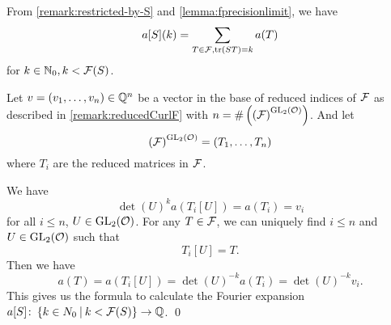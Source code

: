 \begin{remark}
From \cref{remark:restricted-by-S} and \cref{lemma:fprecisionlimit}, we have
\[ a[S] (k) = \sum_{T \in \mathcal{F}, \textup{\textrm{tr}}(S T) = k} a(T) \]
for $k \in \mathbb{N}_0, k < \mathcal{F}(S)$.

Let $v = (v_1, \dots, v_n) \in \mathbb{Q}^n$ be a vector in the base of reduced indices of $\mathcal{F}$ as described in \cref{remark:reducedCurlF} with $n = \# \left( {\left(\mathcal{F}\right)}^{\operatorname{GL}_2(\mathcal{O})} \right)$. And let
\[ {\left(\mathcal{F}\right)}^{\operatorname{GL}_2(\mathcal{O})} = (T_1, \dots, T_n) \]
where $T_i$ are the reduced matrices in $\mathcal{F}$.

We have
\[ \det(U)^k a(T_i[U]) = a(T_i) = v_i \]
for all $i \le n$, $U \in \operatorname{GL}_2(\mathcal{O})$.
For any $T \in \mathcal{F}$, we can uniquely find $i \le n$ and $U \in \operatorname{GL}_2(\mathcal{O})$ such that
\[ T_i[U] = T. \]
Then we have
\[ a(T) = a(T_i[U]) = \det(U)^{-k} a(T_i) = \det(U)^{-k} v_i . \]
This gives us the formula to calculate the Fourier expansion $a[S] \colon \Set{k \in N_0}{k < \FPrecisionLimit{S}} \rightarrow \Q$.
\qed
\end{remark}

